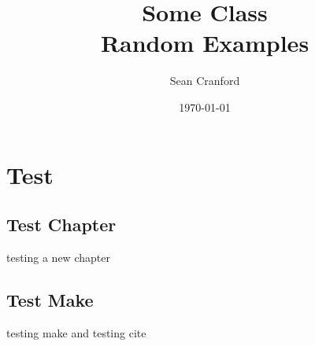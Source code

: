 \documentclass[12pt,letterpaper]{report}
\title{\Huge{Some Class}\\Random Examples}
\author{\huge{Sean Cranford}}
\date{\today} %
\begin{document}
\maketitle
\newpage

\tableofcontents
\pagebreak


\chapter{Test}
\section{Test Chapter}
testing a new chapter
\section{Test Make}
testing make and testing cite \cite{candlerRateEffectsHypersonic2019}

\newpage
\printbibliography[heading=bibintoc] %
\end{document}
